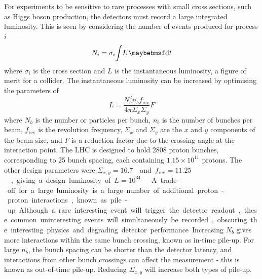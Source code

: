 For experiments to be sensitive to rare processes with small cross sections, such as Higgs 
boson production, the detectors must record a large integrated luminosity. This is seen by 
considering the number of events produced for process $i$
\begin{equation}
	N_i = \sigma_i \! \int \! L \, \diff t
	\label{eq:event_rate}
\end{equation}
where $\sigma_i$ is the cross section and $L$ is the instantaneous luminosity, a figure of 
merit for a collider. The instantaneous luminosity can be increased by optimising the
parameters of
\begin{equation}
	L = \frac{N_b^2 n_b f_{\text{rev}}}{4\pi \varSigma_x \varSigma_y} F
	\label{eq:lumi_beam}
\end{equation}
where $N_b$ is the number or particles per bunch, $n_b$ is the number of bunches per beam, 
$f_{\text{rev}}$ is the revolution frequency, $\varSigma_x$ and $\varSigma_y$ are the $x$ 
and $y$ components of the beam size, and $F$ is a reduction factor due to the crossing 
angle at the interaction point. The \ac{LHC} is designed to hold 2808 proton bunches, 
corresponding to \unit{25}{\nano\second} bunch spacing, each containing $1.15\times10^{11}$
protons. The other design parameters were \unit{$\varSigma_{x,y} = 16.7$}{\micro\metre} 
and \unit{$f_{\text{rev}} = 11.25$}{\kHz}, giving a design luminosity of 
\unit{$L = 10^{34}$}{\lumiunits} \cite{LHC}.

A trade-off for a large luminosity is a large number of additional proton-proton 
interactions, known as pile-up. Although a rare interesting event will trigger the 
detector readout, these common uninteresting events will simultaneously be recorded, 
obscuring the interesting physics and degrading detector performance. Increasing $N_b$ 
gives more interactions within the same bunch crossing, known as in-time pile-up. For 
large $n_b$, the bunch spacing can be shorter than the detector latency, and interactions 
from other bunch crossings can affect the measurement - this is known as out-of-time 
pile-up. Reducing $\varSigma_{x,y}$ will increase both types of pile-up.
